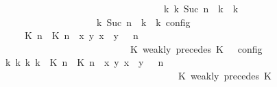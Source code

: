 \begin{isabellebody}
\ \ \ \ \ \ \ \ \ \ \ \ \ \ \ \ \ \ \ \ \ \ \ \ \ \ \ \ \ \ \ \ \ \ {\isasymhookrightarrow}\isactrlbsup k\isactrlesup \ {\isacharparenleft}{\isasymGamma}\isactrlsub k{\isacharcomma}\ Suc\ n\ {\isasymturnstile}\ {\isasymPsi}\isactrlsub k\ {\isasymtriangleright}\ {\isasymPhi}\isactrlsub k{\isacharparenright}{\isacharparenright}\isanewline
\ \ \ \ \ \ \ \ \ \ \ \ \ \ \ \ {\isasymand}\ {\isacharparenleft}{\isasymrho}\ {\isasymin}\ {\isasymlbrakk}\ {\isasymGamma}\isactrlsub k{\isacharcomma}\ Suc\ n\ {\isasymturnstile}\ {\isasymPsi}\isactrlsub k\ {\isasymtriangleright}\ {\isasymPhi}\isactrlsub k\ {\isasymrbrakk}\isactrlsub c\isactrlsub o\isactrlsub n\isactrlsub f\isactrlsub i\isactrlsub g{\isacharparenright}{\isacharparenright}{\isacartoucheclose}\isanewline
\ \ \ \ \ \ \isamarkupfalse%
\ {\isacharminus}\isanewline
\ \ \ \ \ \ \ \ \isamarkupfalse%
\ {\isacartoucheopen}{\isasymrho}\ {\isasymin}\ {\isasymlbrakk}\ {\isacharparenleft}{\isacharparenleft}{\isasymlceil}{\isacharhash}\isactrlsup {\isasymle}\ K\ n{\isacharcomma}\ {\isacharhash}\isactrlsup {\isasymle}\ K\ n{\isasymrceil}\ {\isasymin}\ {\isacharparenleft}{\isasymlambda}{\isacharparenleft}x{\isacharcomma}\ y{\isacharparenright}{\isachardot}\ x\ {\isasymle}\ y{\isacharparenright}{\isacharparenright}\ {\isacharhash}\ {\isasymGamma}{\isacharparenright}{\isacharcomma}\ n\isanewline
\ \ \ \ \ \ \ \ \ \ \ \ \ \ \ \ \ \ \ \ \ \ \ \ {\isasymturnstile}\ {\isasymPsi}\ {\isasymtriangleright}\ {\isacharparenleft}{\isacharparenleft}K\ weakly\ precedes\ K\ {\isacharhash}\ {\isasymPhi}{\isacharparenright}\ {\isasymrbrakk}\isactrlsub c\isactrlsub o\isactrlsub n\isactrlsub f\isactrlsub i\isactrlsub g{\isacartoucheclose}\isanewline
\ \ \ \ \ \ \ \ \isamarkupfalse%
\ {\isacartoucheopen}{\isasymexists}{\isasymGamma}\isactrlsub k\ {\isasymPsi}\isactrlsub k\ {\isasymPhi}\isactrlsub k\ k{\isachardot}\ {\isacharparenleft}{\isacharparenleft}{\isacharparenleft}{\isacharparenleft}{\isasymlceil}{\isacharhash}\isactrlsup {\isasymle}\ K\ n{\isacharcomma}\ {\isacharhash}\isactrlsup {\isasymle}\ K\ n{\isasymrceil}\ {\isasymin}\ {\isacharparenleft}{\isasymlambda}{\isacharparenleft}x{\isacharcomma}\ y{\isacharparenright}{\isachardot}\ x\ {\isasymle}\ y{\isacharparenright}{\isacharparenright}\ {\isacharhash}\ {\isasymGamma}{\isacharparenright}{\isacharcomma}\ n\isanewline
\ \ \ \ \ \ \ \ \ \ \ \ \ \ \ \ \ \ \ \ \ \ \ \ \ \ \ \ \ \ \ \ \ \ {\isasymturnstile}\ {\isasymPsi}\ {\isasymtriangleright}\ {\isacharparenleft}{\isacharparenleft}K\ weakly\ precedes\ K\ {\isacharhash}\ {\isasymPhi}{\isacharparenright}{\isacharparenright}\isanewline

\end{isabellebody}
